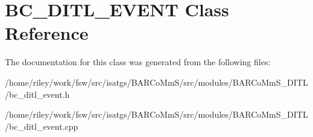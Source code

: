 \hypertarget{class_b_c___d_i_t_l___e_v_e_n_t}{}\section{B\+C\+\_\+\+D\+I\+T\+L\+\_\+\+E\+V\+E\+NT Class Reference}
\label{class_b_c___d_i_t_l___e_v_e_n_t}


The documentation for this class was generated from the following files\+:\begin{DoxyCompactItemize}
\item 
/home/riley/work/fsw/src/isatgs/\+B\+A\+R\+Co\+Mm\+S/src/modules/\+B\+A\+R\+Co\+Mm\+S\+\_\+\+D\+I\+T\+L/bc\+\_\+ditl\+\_\+event.\+h\item 
/home/riley/work/fsw/src/isatgs/\+B\+A\+R\+Co\+Mm\+S/src/modules/\+B\+A\+R\+Co\+Mm\+S\+\_\+\+D\+I\+T\+L/bc\+\_\+ditl\+\_\+event.\+cpp\end{DoxyCompactItemize}
